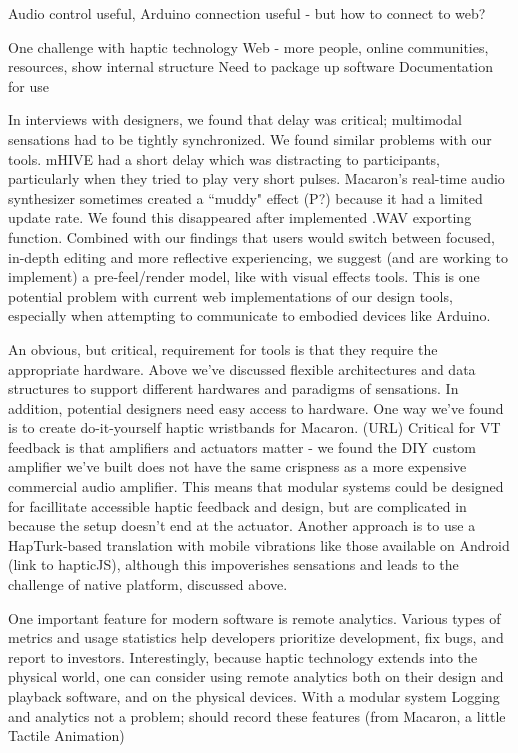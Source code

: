 Audio control useful, Arduino connection useful - but how to connect to web?


One challenge with haptic technology 
Web - more people, online communities, resources, show internal structure
Need to package up software
Documentation for use

In interviews with designers, we found that delay was critical; multimodal sensations had to be tightly synchronized.
We found similar problems with our tools.
mHIVE had a short delay which was distracting to participants, particularly when they tried to play very short pulses.
Macaron's real-time audio synthesizer sometimes created a ``muddy" effect (P?) because it had a limited update rate.
We found this disappeared after implemented .WAV exporting function.
Combined with our findings that users would switch between focused, in-depth editing and more reflective experiencing, we suggest (and are working to implement) a pre-feel/render model, like with visual effects tools.
This is one potential problem with current web implementations of our design tools, especially when attempting to communicate to embodied devices like Arduino.


An obvious, but critical, requirement for \haxd tools is that they require the appropriate hardware.
Above we've discussed flexible architectures and data structures to support different hardwares and paradigms of sensations.
In addition, potential designers need easy access to hardware.
One way we've found is to create do-it-yourself haptic wristbands for Macaron. (URL)
Critical for VT feedback is that amplifiers and actuators matter - we found the DIY custom amplifier we've built does not have the same crispness as a more expensive commercial audio amplifier.
This means that modular systems could be designed for facillitate accessible haptic feedback and design, but are complicated in because the setup doesn't end at the actuator.
Another approach is to use a HapTurk-based translation with mobile vibrations like those available on Android (link to hapticJS), although this impoverishes sensations and leads to the challenge of native platform, discussed above.


One important feature for modern software is remote analytics.
Various types of metrics and usage statistics help developers prioritize development, fix bugs, and report to investors.
Interestingly, because haptic technology extends into the physical world, one can consider using remote analytics both on their design and playback software, and on the physical devices.
With a modular system
Logging and analytics not a problem; should record these features (from Macaron, a little Tactile Animation)




